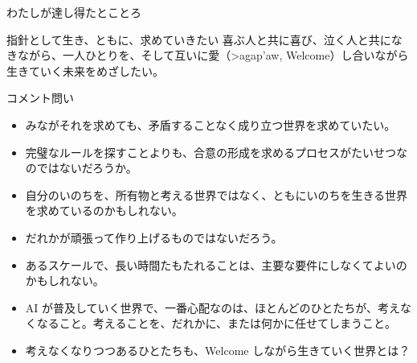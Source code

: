 \documentclass[10pt, dvipdfmx]{beamer}
\begin{document}
\begin{frame}{わたしが達し得たとことろ}

\begin{alertblock}{指針として生き、ともに、求めていきたい}
喜ぶ人と共に喜び、泣く人と共になきながら、一人ひとりを、そして互いに愛（{\greektext >agap'aw}, Welcome）し合いながら生きていく未来をめざしたい。
\end{alertblock}

\begin{exampleblock}{コメント\hfill 問い}
\begin{itemize}
\item みながそれを求めても、矛盾することなく成り立つ世界を求めていたい。
\item 完璧なルールを探すことよりも、合意の形成を求めるプロセスがたいせつなのではないだろうか。
\item 自分のいのちを、所有物と考える世界ではなく、ともにいのちを生きる世界を求めているのかもしれない。
\item だれかが頑張って作り上げるものではないだろう。
\item あるスケールで、長い時間たもたれることは、主要な要件にしなくてよいのかもしれない。
\item AI が普及していく世界で、一番心配なのは、ほとんどのひとたちが、考えなくなること。考えることを、だれかに、または何かに任せてしまうこと。
\item 考えなくなりつつあるひとたちも、Welcome しながら生きていく世界とは？
\end{itemize}

\end{exampleblock}

%
%
\end{frame}
\end{document}

